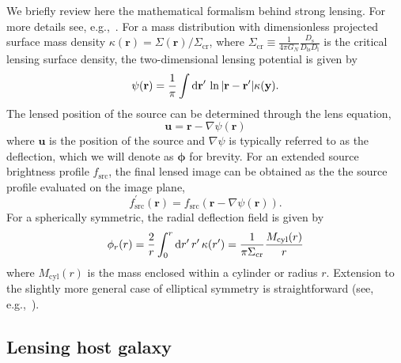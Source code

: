 \documentclass[twocolumn]{aastex62}
\begin{document}
We briefly review here the mathematical formalism behind strong lensing. For more details see, e.g.,~\cite{2001astro.ph..2341K,1992grle.book.....S}. For a mass distribution with dimensionless projected surface mass density $\kappa(\mathbf{r})=\Sigma(\mathbf{r}) / \Sigma_{\mathrm{cr}}$, where $\Sigma_{\mathrm{cr}}\equiv \frac{1}{4 \pi G_N} \frac{D_{\mathrm{s}}}{D_{\mathrm{ls}} D_{\mathrm{l}}}$ is the critical lensing surface density, the two-dimensional lensing potential is given by
\begin{equation}
\psi(\mathbf{r})=\frac{1}{\pi} \int \diff \mathbf{r^\prime}\,\ln |\mathbf{r}-\mathbf{r^\prime}| \kappa(\mathbf{y}) .
\end{equation}
The lensed position of the source can be determined through the lens equation,
\begin{equation}
\mathbf{u}=\mathbf{r}-\nabla \psi(\mathbf{r})
\end{equation}
where $\mathbf{u}$ is the position of the source and $\nabla \psi$ is typically referred to as the deflection, which we will denote as $\boldsymbol\phi$ for brevity. For an extended source brightness profile $f_\mathrm{src}$, the final lensed image can be obtained as the the source profile evaluated on the image plane,
\begin{equation}
f^\prime_\mathrm{src}(\mathbf r) = f_\mathrm{src}\left(\mathbf{r}-\nabla \psi(\mathbf{r})\right).
\end{equation}
For a spherically symmetric, the radial deflection field is given by
\begin{equation}
\phi_{r}(r)=\frac{2}{r} \int_{0}^{r}\diff r^\prime\,r^\prime\,\kappa(r^\prime) =\frac{1}{\pi \Sigma_{\mathrm{cr}}} \frac{M_{\mathrm{cyl}}(r)}{r}
\end{equation}
where $M_{\mathrm{cyl}}(r)$ is the mass enclosed within a cylinder or radius $r$. Extension to the slightly more general case of elliptical symmetry is straightforward (see, e.g.,~\cite{2001astro.ph..2341K}).

\subsection{Lensing host galaxy}
\end{document}
